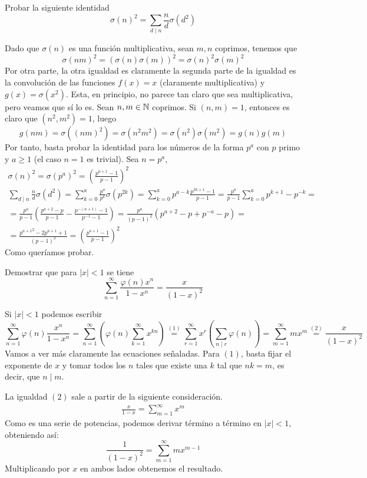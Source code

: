 \documentclass[twoside]{article}
\begin{document}
\newpage
\begin{ejercicio}{11}
Probar la siguiente identidad	
\[
\sigma(n)^2 = \sum_{d\mid n} \frac{n}{d}\sigma(d^2) 
\]
\begin{solucion}
Dado que $\sigma(n)$ es una función multiplicativa, sean $m,n$ coprimos, tenemos que
\[
\sigma(nm)^2 = (\sigma(n)\sigma(m))^2 = \sigma(n)^2\sigma(m)^2
\]
Por otra parte, la otra igualdad es claramente la segunda parte de la igualdad es la convolución de las funciones $f(x)=x$ (claramente multiplicativa) y $g(x)=\sigma(x^2)$. Esta, en principio, no parece tan claro que sea multiplicativa, pero veamos que sí lo es. Sean $n,m\in\mathbb{N}$ coprimos. Si $(n,m)=1$, entonces es claro que $(n^2,m^2)=1$, luego
$$
g(nm)=\sigma((nm)^2) = \sigma(n^2 m^2)= \sigma(n^2)\sigma(m^2)=g(n)g(m)$$
Por tanto, basta probar la identidad para los números de la forma $p^a$ con $p$ primo y $a\geq 1$ (el caso $n=1$ es trivial). Sea $n=p^a$,
\begin{gather*}
\sigma(n)^2 = \sigma(p^a)^2 = \left(\frac{p^{a+1}-1}{p-1}\right)^2\\  \sum_{d\mid n} \frac{n}{d}\sigma(d^2) = \sum_{k=0}^a \frac{p^a}{p^k}\sigma(p^{2k})= \sum_{k=0}^a p^{a-k}\frac{p^{2k+1}-1}{p-1} = \frac{p^a}{p-1} \sum_{k=0}^a p^{k+1}- p^{-k} = \\
 = \frac{p^a}{p-1} \left(\frac{p^{a+2}-p}{p-1}-\frac{p^{-(a+1)}-1}{p^{-1}-1}\right) = \frac{p^a}{(p-1)^2}(p^{a+2}-p+ p^{-a}-p) = \\
 = \frac{{p^{a+1}}^2-2p^{a+1}+1}{(p-1)^2} =  \left(\frac{p^{a+1}-1}{p-1}\right)^2
\end{gather*}
Como queríamos probar.
\end{solucion}
\end{ejercicio}

\newpage

\begin{ejercicio}{12}
Demostrar que para $|x| < 1$ se tiene
\[ \sum_{n=1}^{∞} \frac{φ(n) x^n}{1-x^n} = \frac{x}{(1-x)^2} \]
\end{ejercicio}
\begin{solucion}
Si $|x|<1$ podemos escribir
$$
\sum_{n=1}^{∞} φ(n)\frac{ x^n}{1-x^n} = \sum_{n=1}^{∞} \left(φ(n)\sum_{k=1}^\infty x^{kn} \right) \overset{(1)}{=} \sum_{r=1}^\infty x^r\left(\sum_{n \mid r}\varphi(n)\right) = \sum_{m=1}^\infty m x^m \overset{(2)}{=}\frac{x}{(1-x)^2}
$$
Vamos a ver más claramente las ecuaciones señaladas.
Para $(1)$, basta fijar el exponente de $x$ y tomar todos los $n$ tales que existe una $k$ tal que $nk=m$, es decir, que $n \mid m$.

La igualdad $(2)$ sale a partir de la siguiente consideración. 
\begin{align*}
\frac{x}{1-x} = \sum_{m=1}^\infty x^m
\end{align*}
Como es una serie de potencias, podemos derivar término a término en $|x|<1$, obteniendo así:
\[ \frac{1}{(1-x)^2} = \sum_{m=1}^\infty mx^{m-1} \]
Multiplicando por $x$ en ambos lados obtenemos el resultado.
\end{solucion}
\end{document}
